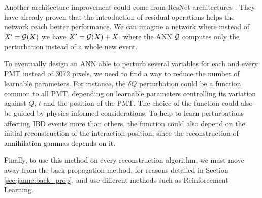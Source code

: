 \documentclass[../main.tex]{subfiles}
\begin{document}
Another architecture improvement could come from ResNet architectures \cite{he_deep_2016}. They have already proven that the introduction of residual operations helps the network reach better performance. We can imagine a network where instead of $X' = {\cal G}(X)$ we have $X' = {\cal G}(X) + X$, where the ANN ${\cal G}$ computes only the perturbation instead of a whole new event.

To eventually design an ANN able to perturb several variables for each and every PMT instead of 3072 pixels, we need to find a way to reduce the number of learnable parameters. For instance, the $\delta Q$ perturbation could be a function common to all PMT, depending on learnable parameters controlling its variation against $Q$, $t$  and the position of the PMT. The choice of the function could also be guided by physics informed considerations. To help to learn perturbations affecting IBD events more than others,  the  function could also depend on the initial reconstruction of the  interaction position, since the reconstruction of annihilation gammas depends on it.

Finally, to use this method on every reconstruction algorithm, we must move away from the back-propagation method, for reasons detailed in Section \ref{sec:janne:back_prop}, and use different methods such as Reinforcement Learning.
\end{document}
